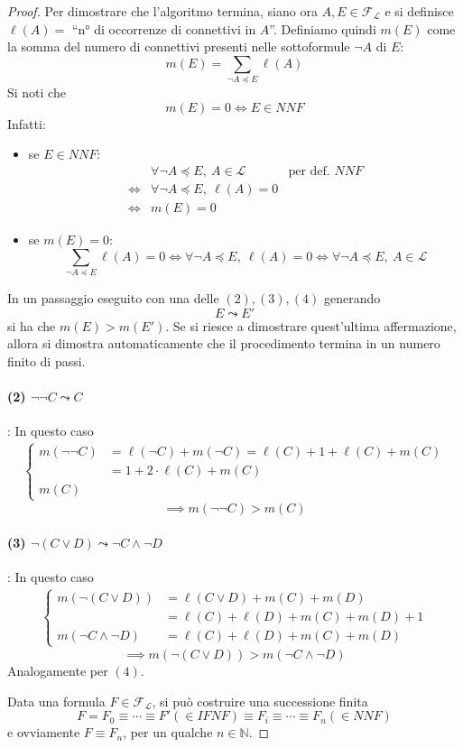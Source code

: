 \begin{proof}
Per dimostrare che l'algoritmo termina, siano ora $A,E \in \mathscr{F_L}$ e si definisce $\ell(A) = $ ``n° di occorrenze di connettivi in $A$''.
Definiamo quindi $m(E)$ come la somma del numero di connettivi presenti nelle sottoformule $\neg A$ di $E$: 
$$
m(E) = \sum_{\neg A \preccurlyeq E} \ell(A)
$$
Si noti che 
$$
m(E) = 0 \iff E \in NNF
$$
Infatti:
\begin{itemize}
  \item  se $E \in NNF$:
    \begin{align*}
      & \forall \neg A \preccurlyeq E,\ A \in \mathscr{L} & \text{per def. } NNF\\
      \iff & \forall \neg A \preccurlyeq E,\ \ell(A) = 0 \\
      \iff & m(E) = 0
    \end{align*}
  \item se $m(E) = 0$:
    $$
    \sum_{\neg A \preccurlyeq E} \ell(A) = 0 \iff \forall \neg A \preccurlyeq E,\ \ell(A) = 0 \iff \forall \neg A \preccurlyeq E,\ A \in \mathscr{L}
    $$ 
\end{itemize}
In un passaggio eseguito con una delle $(2), (3), (4)$ generando 
$$
E \leadsto E'
$$
si ha che $m(E) > m(E')$. Se si riesce a dimostrare quest'ultima affermazione, 
allora si dimostra automaticamente che il procedimento termina in un numero 
finito di passi. 
\paragraph{(2) $\neg \neg C \leadsto C$}: In questo caso
\begin{align*}
  \begin{cases}
        m(\neg \neg C) & = \ell(\neg C) + m(\neg C)
                         = \ell(C) + 1 + \ell(C) + m(C) \\
                       & = 1 + 2 \cdot \ell(C) + m(C) \\
        m(C)
  \end{cases}
\end{align*}
$$
  \implies m(\neg \neg C) > m(C)
$$

\paragraph{(3) $\neg (C \lor D) \leadsto \neg C \land \neg D$}: In questo caso
\begin{align*}
  \begin{cases}
    m(\neg (C \lor D)) & = \ell(C \lor D) + m(C) + m(D) \\
                       & = \ell(C) + \ell(D) + m(C) + m(D) + 1 \\
    m(\neg C \land \neg D) 
                       & = \ell(C) + \ell(D) + m(C) + m(D)
  \end{cases}
\end{align*}
$$
  \implies m(\neg (C \lor D)) > m(\neg C \land \neg D)
$$
Analogamente per $(4)$.

Data una formula $F \in \mathscr{F_L}$, si può costruire una successione 
finita 
$$ 
F = F_0 \equiv \cdots \equiv F' (\in IFNF) \equiv F_i \equiv \cdots \equiv F_n (\in NNF)
$$
e ovviamente $F \equiv F_n$, per un qualche $n \in \mathbb{N}$. 
\end{proof}

